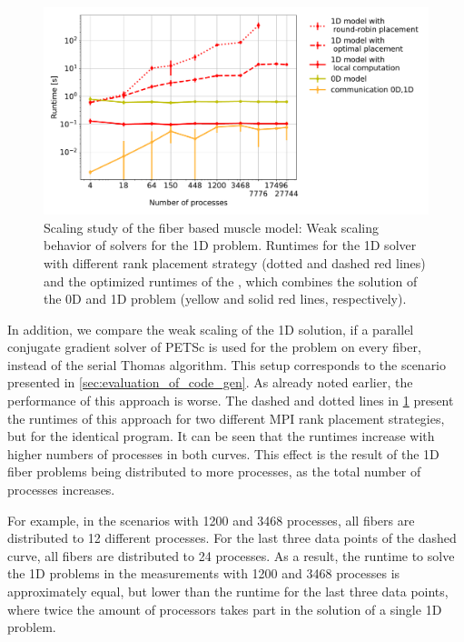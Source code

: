 \begin{figure}
  \centering%
  \includegraphics[width=\textwidth]{images/results/studies/Comparisonof0D-1Dcomputationschemes.pdf}%
  \caption{Scaling study of the fiber based muscle model: Weak scaling behavior of solvers for the 1D problem. Runtimes for the 1D solver with different rank placement strategy (dotted and dashed red lines) and the optimized runtimes of the , which combines the solution of the 0D and 1D problem (yellow and solid red lines, respectively).}%
   \label{fig:hazel_hen_rank_placement}%
\end{figure}

In addition, we compare the weak scaling of the 1D solution, if a parallel conjugate gradient solver of PETSc is used for the problem on every fiber, instead of the serial Thomas algorithm. This setup corresponds to the  scenario presented in \cref{sec:evaluation_of_code_gen}. As already noted earlier, the performance of this approach is worse. The dashed and dotted lines in \cref{fig:hazel_hen_rank_placement} present the runtimes of this approach for two different MPI rank placement strategies, but for the identical program. It can be seen that the runtimes increase with higher numbers of processes in both curves. This effect is the result of the 1D fiber problems being distributed to more processes, as the total number of processes increases. 

For example, in the scenarios with 1200 and 3468 processes, all fibers are distributed to 12 different processes. For the last three data points of the dashed curve, all fibers are distributed to 24 processes. As a result, the runtime to solve the 1D problems in the measurements with 1200 and 3468 processes is approximately equal, but lower than the runtime for the last three data points, where twice the amount of processors takes part in the solution of a single 1D problem.

